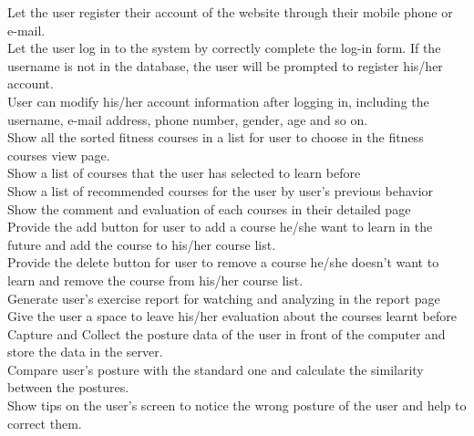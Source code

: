 \documentclass[16pt]{scrreprt}
\begin{document}
Let the user register their account of the website through their mobile phone or e-mail.\\

 
Let the user log in to the system by correctly complete the log-in form. If the username is not in the database, the user will be prompted to register his/her account.\\

 
User can modify his/her account information after logging in, including the username, e-mail address, phone number, gender, age and so on.\\

 
Show all the sorted fitness courses in a list for user to choose in the fitness courses view page. \\

 
Show a list of courses that the user has selected to learn before\\

 
Show a list of recommended courses for the user by user's previous behavior \\

 
Show the comment and evaluation of each courses in their detailed page\\

 
Provide the add button for user to add a course he/she want to learn in the future and add the course to his/her course list.\\

 
Provide the delete button for user to remove a course he/she doesn't want to learn and remove the course from his/her course list.\\


Generate user's exercise report for watching and analyzing in the report page\\
 
Give the user a space to leave his/her evaluation about the courses learnt before\\

Capture and Collect the posture data of the user in front of the computer and store the data in the server.\\


Compare user's posture with the standard one and calculate the similarity between the postures.\\


Show tips on the user's screen to notice the wrong posture of the user and help to correct them.\\
\end{document}
